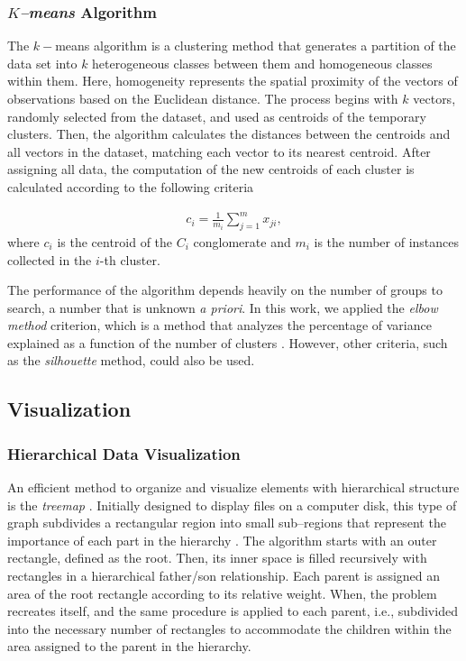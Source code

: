 \documentclass[5p,authoryear,preprint,12pt]{elsarticle}
\begin{document}
\subsubsection{\emph{$K$--means} Algorithm}

The $k-$means algorithm \citep{macqueen1967some} is a clustering method that generates a partition of the data set into $k$ heterogeneous classes between them and homogeneous classes within them. Here, homogeneity represents the spatial proximity of the vectors of observations based on the Euclidean distance. The process begins with $k$ vectors, randomly selected from the dataset, and used as centroids of the temporary clusters. Then, the algorithm calculates the distances between the centroids and all vectors in the dataset, matching each vector to its nearest centroid. After assigning all data, the computation of the new centroids of each cluster is calculated according to the following criteria

\begin{eqnarray}\label{kmeans}
c_{i}=\frac{1}{m_{i}}\sum\limits_{j=1}^{m}x_{ji},
\end{eqnarray}
where $c_{i}$ is the centroid of the $C_{i}$ conglomerate and $m_{i}$ is the number of instances collected in the $i$-th cluster. 

The performance of the algorithm depends heavily on the number of groups to search, a number that is unknown \textit{a priori}. In this work, we applied the \emph{elbow method} criterion, which is a method that analyzes the percentage of variance explained as a function of the number of clusters \citep{bholowalia2014ebk}. However, other criteria, such as the \emph{silhouette} method, could also be used.

\subsection{Visualization}
\subsubsection{Hierarchical Data Visualization}

An efficient method to organize and visualize elements with hierarchical structure is the \emph{treemap} \citep{johnson1991tree}. Initially designed to display files on a computer disk, this type of graph subdivides a rectangular region into small sub--regions that represent the importance of each part in the hierarchy \citep{marson2010automatic}. The algorithm starts with an outer rectangle, defined as the root. Then, its inner space is filled recursively with rectangles in a hierarchical father/son relationship. Each parent is assigned an area of the root rectangle according to its relative weight. When, the problem recreates itself, and the same procedure is applied to each parent, i.e., subdivided into the necessary number of rectangles to accommodate the children within the area assigned to the parent in the hierarchy.
\end{document}
